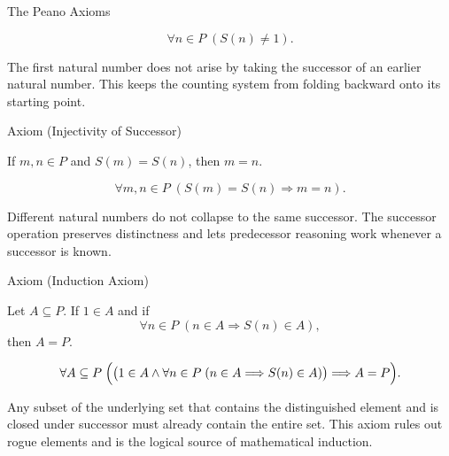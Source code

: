 \begin{topicbox}{The Peano Axioms}
\begin{remark*}
\[
\forall n \in P\;(S(n) \neq 1).
\]
\end{remark*}

\begin{remark*}[Interpretation]
The first natural number does not arise by taking the successor of an earlier
natural number. This keeps the counting system from folding backward onto its
starting point.
\end{remark*}

\NoLocalDependencies

\begin{axiombox}{Axiom (Injectivity of Successor)}
\begin{axiom}
\label{ax:peano-successor-injective}
If $m,n \in P$ and $S(m)=S(n)$, then $m=n$.
\end{axiom}
\end{axiombox}

\begin{remark*}
\[
\forall m,n \in P\;(S(m)=S(n) \Longrightarrow m=n).
\]
\end{remark*}

\begin{remark*}[Interpretation]
Different natural numbers do not collapse to the same successor. The successor
operation preserves distinctness and lets predecessor reasoning work whenever a
successor is known.
\end{remark*}

\NoLocalDependencies

\begin{axiombox}{Axiom (Induction Axiom)}
\begin{axiom}
\label{ax:peano-induction}
Let $A \subseteq P$. If $1 \in A$ and if
\[
\forall n \in P\;(n \in A \Longrightarrow S(n) \in A),
\]
then $A=P$.
\end{axiom}
\end{axiombox}

\begin{remark*}
\[
\forall A \subseteq P\;
\Bigl(\bigl(1 \in A \land
\forall n \in P\;(n \in A \Longrightarrow S(n) \in A)\bigr)
\Longrightarrow A=P\Bigr).
\]
\end{remark*}

\begin{remark*}[Interpretation]
Any subset of the underlying set that contains the distinguished element and is
closed under successor must already contain the entire set. This axiom rules
out rogue elements and is the logical source of mathematical induction.
\end{remark*}


\end{topicbox}
